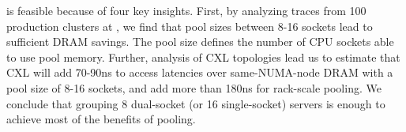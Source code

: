 \begin{comment} %
In more detail, making memory pooling broadly used in the public cloud faces three challenges.
First, cloud providers seek to \emph{hide any additional memory access latency} from the vast majority of customers
who are not expert developers and workloads that do not explicitly manage
memory placement.
Second, cloud providers seek to \emph{preserve customer inertia} in that new technology should not require modification to the customer workloads or the guest OS.
Third, the system must be \emph{compatible with virtualization acceleration} which requires the whole address range of a VM to be statically pinned in hypervisor-level page tables~\cite{nicpagefault.asplos17,tian2020coiommu,yassour2010dma,willmann2008protection,amit2011viommu,ben2010turtles}.
For example, accelerated networking is enabled by default on AWS and Azure~\cite{awsaccelnet,azureaccelnet}.
\end{comment}








\sys is feasible because of four key insights.
First, by analyzing traces from 100 production clusters at \azure, we find that pool sizes between 8-16 sockets lead to sufficient DRAM savings.
The pool size defines the number of CPU sockets able to use pool memory.
Further, analysis of CXL topologies lead us to estimate that CXL will add 70-90ns to access latencies over same-NUMA-node DRAM with a pool size of 8-16 sockets, and add more than 180ns for rack-scale pooling.
We conclude that grouping 8 dual-socket (or 16 single-socket) servers is enough to achieve most of the benefits of pooling.

